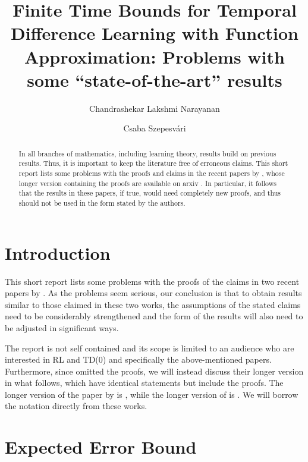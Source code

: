\documentclass{article}
\title{Finite Time Bounds for Temporal Difference Learning with Function Approximation: Problems with some ``state-of-the-art'' results}
\author{
Chandrashekar Lakshmi Narayanan
\and
Csaba Szepesv\'ari 
}
\date{}
\begin{document}

\maketitle
\begin{abstract}
In all branches of mathematics, including learning theory,
results build on previous results. Thus, it is important to keep the literature free of erroneous claims.
This short report lists some problems with the proofs and claims in the recent papers by \cite{flstd,lstdicml}, whose longer version containing the proofs are available on arxiv \citep{flstda,lstdicmla}. 
In particular, it follows that the results in these papers, if true, would need completely new proofs, and thus should not be used in the form stated by the authors.
\end{abstract}
\section{Introduction}
This short report lists some problems with the proofs of the claims in two recent papers  by \cite{flstd,lstdicml}.
As the problems seem serious, our conclusion is that to obtain results similar to those claimed in these two works, the assumptions of the stated claims need to be considerably strengthened and the form of the results will also need to be adjusted in significant ways.

The report is not self contained and its scope is limited to an audience who are interested in RL and TD(0) and specifically the above-mentioned papers.
Furthermore, since \cite{flstd,lstdicml} omitted the proofs, we will instead discuss their longer version in what follows, which have identical statements but include the proofs. The longer version of the paper by \cite{flstd} is \citep{flstda}, while the longer version
of \cite{lstdicml} is \citep{lstdicmla}.
We will  borrow the notation directly from these works.

\section{Expected Error Bound}
\end{document}
